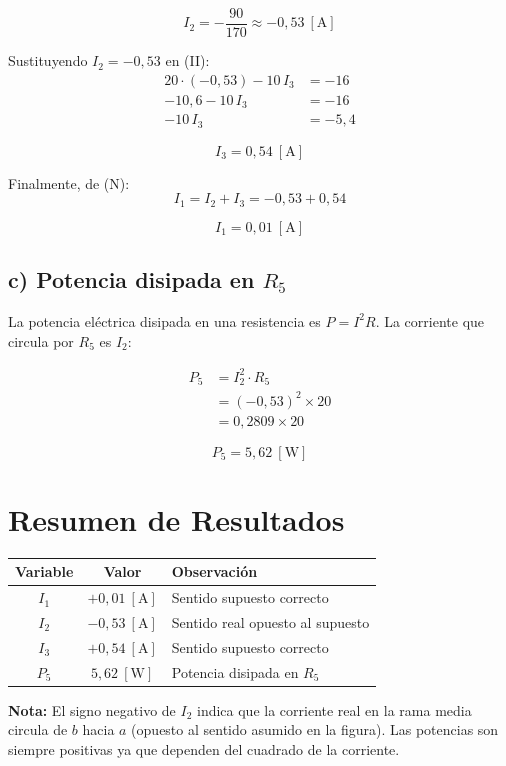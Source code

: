 \documentclass[12pt,letterpaper]{article}
\begin{document}
\[
    \boxed{I_2 = -\frac{90}{170} \approx -0{,}53\ [\text{A}]}
\]

Sustituyendo $I_2 = -0{,}53$ en (II):
\begin{align*}
    20\cdot(-0{,}53) - 10\,I_3 &= -16 \\
    -10{,}6 - 10\,I_3 &= -16 \\
    -10\,I_3 &= -5{,}4
\end{align*}

\[
    \boxed{I_3 = 0{,}54\ [\text{A}]}
\]

Finalmente, de (N):
\[
    I_1 = I_2 + I_3 = -0{,}53 + 0{,}54
\]

\[
    \boxed{I_1 = 0{,}01\ [\text{A}]}
\]

\subsection*{c) Potencia disipada en $R_5$}

La potencia el\'ectrica disipada en una resistencia es $P = I^2 R$.
La corriente que circula por $R_5$ es $I_2$:

\begin{align*}
    P_5 &= I_2^2 \cdot R_5 \\
        &= (-0{,}53)^2 \times 20 \\
        &= 0{,}2809 \times 20
\end{align*}

\[
    \boxed{P_5 = 5{,}62\ [\text{W}]}
\]

\section*{Resumen de Resultados}

\begin{center}
\begin{tabular}{|c|c|l|}
\hline
\textbf{Variable} & \textbf{Valor} & \textbf{Observaci\'on} \\
\hline
$I_1$ & $+0{,}01\ [\text{A}]$ & Sentido supuesto correcto \\
$I_2$ & $-0{,}53\ [\text{A}]$ & Sentido real opuesto al supuesto \\
$I_3$ & $+0{,}54\ [\text{A}]$ & Sentido supuesto correcto \\
$P_5$ & $5{,}62\ [\text{W}]$  & Potencia disipada en $R_5$ \\
\hline
\end{tabular}
\end{center}

\medskip
\noindent\textbf{Nota:} El signo negativo de $I_2$ indica que la corriente real en la rama media
circula de $b$ hacia $a$ (opuesto al sentido asumido en la figura). Las potencias son siempre
positivas ya que dependen del cuadrado de la corriente.
\end{document}
